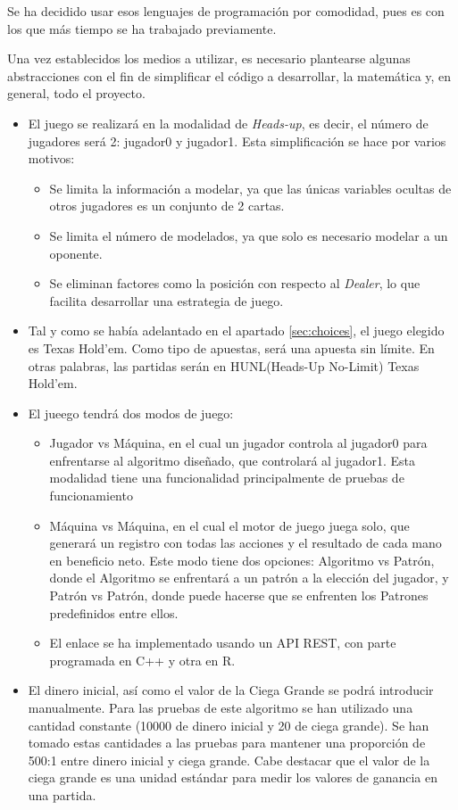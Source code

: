 Se ha  decidido usar esos lenguajes de programación por comodidad, pues es con los que más tiempo se ha trabajado previamente.

Una vez establecidos los medios a utilizar, es necesario plantearse algunas abstracciones con el fin de simplificar el código a desarrollar, la matemática y, en general, todo el proyecto.

 \begin{itemize}
\item El juego se realizará en la modalidad de \textit{Heads-up}, es decir, el número de jugadores será 2: jugador0 y jugador1. Esta simplificación se hace por varios motivos:
 \begin{itemize}
\item Se limita la información a modelar, ya que las únicas variables ocultas de otros jugadores es un conjunto de 2 cartas.
\item Se limita el número de modelados, ya que solo es necesario modelar a un oponente.
\item Se eliminan factores como la posición con respecto al \textit{Dealer}, lo que facilita desarrollar una estrategia de juego.
\end{itemize}
\item Tal y como se había adelantado en el apartado \ref{sec:choices}, el juego elegido es Texas Hold'em. Como tipo de apuestas, será una apuesta sin límite. En otras palabras, las partidas serán en HUNL(Heads-Up No-Limit) Texas Hold'em.
\item El jueego tendrá dos modos de juego: 
\begin{itemize}
\item Jugador vs Máquina, en el cual un jugador controla al jugador0 para enfrentarse al algoritmo diseñado, que controlará al jugador1. Esta modalidad tiene una funcionalidad principalmente de pruebas de funcionamiento
\item Máquina vs Máquina, en el cual el motor de juego juega solo, que generará un registro con todas las acciones y el resultado de cada mano en beneficio neto. Este modo tiene dos opciones: Algoritmo vs Patrón, donde el Algoritmo se enfrentará a un patrón a la elección del jugador, y Patrón vs Patrón, donde puede hacerse que se enfrenten los Patrones predefinidos entre ellos.
\item El enlace se ha implementado usando un API REST, con parte programada en C++ y otra en R.
\end{itemize}
\item El dinero inicial, así como el valor de la Ciega Grande se podrá introducir manualmente. Para las pruebas de este algoritmo se han utilizado una cantidad constante (10000 de dinero inicial y 20 de ciega grande). Se han tomado estas cantidades a las pruebas para mantener una proporción de 500:1 entre dinero inicial y ciega grande. Cabe destacar que el valor de la ciega grande es una unidad estándar para medir los valores de ganancia en una partida.

\end{itemize}

